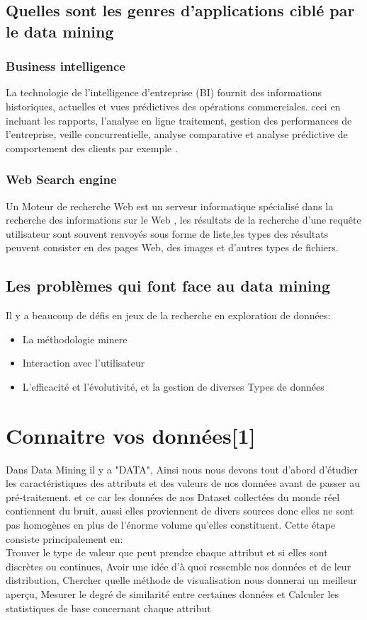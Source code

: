 \documentclass[12pt,a4paper,oneside]{book}
\begin{document}
\section{Quelles sont les genres d'applications ciblé par le data mining}
\subsection{Business intelligence}
La technologie de l'intelligence d'entreprise  (BI) fournit des informations historiques, actuelles et
vues prédictives des opérations commerciales. 
ceci en incluant les rapports, l'analyse en ligne
traitement, gestion des performances de l'entreprise, veille concurrentielle, analyse comparative et analyse prédictive de comportement des clients par exemple .
\subsection{Web  Search engine }
Un Moteur de recherche Web est un serveur informatique spécialisé dans la recherche des informations sur le Web , les résultats de la recherche d’une requête utilisateur sont souvent renvoyés sous forme de liste,les types des résultats peuvent consister en des pages Web, des images et d’autres types de fichiers.
\section{Les problèmes qui font face au data mining}
Il y a beaucoup de défis en jeux de la recherche en exploration de données:
\begin{itemize}
	\item  La méthodologie minere
	\item Interaction avec l'utilisateur
	\item  L'efficacité et l'évolutivité, et la gestion de diverses Types de données
\end{itemize}



\chapter{Connaitre vos données[1]}

Dans Data Mining il y a "DATA", Ainsi nous nous devons tout d'abord d'étudier les caractéristiques des attributs et des valeurs de nos données avant de passer au pré-traitement. 
et ce car les données de nos Dataset collectées du monde réel contiennent du bruit, aussi elles proviennent de divers sources donc elles ne sont pas homogènes en plus de l'énorme volume qu'elles constituent.
Cette étape consiste principalement en:\\
\textbf{ }
Trouver le type de valeur que peut prendre chaque attribut et si elles sont discrètes ou continues, Avoir une idée d'à quoi ressemble nos données et de leur distribution, Chercher quelle méthode de visualisation nous donnerai un meilleur aperçu, Mesurer le degré de similarité entre certaines données et Calculer les statistiques de base concernant chaque attribut
\end{document}
